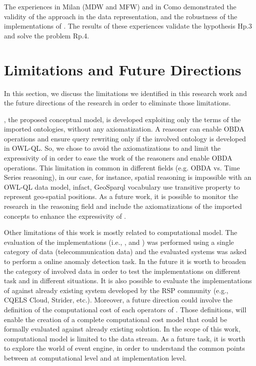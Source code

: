 The experiences in Milan (MDW and MFW) and in Como demonstrated the validity of the \frappe{} approach in the data representation, and the robustness of the implementations of \river{}.
The results of these experiences validate the hypothesis \textsf{Hp.3} and solve the problem \textsf{Rp.4}.

\section{Limitations and Future Directions}
In this section, we discuss the limitations we identified in this research work and the future directions of the research in order to eliminate those limitations.

\frappe{}, the proposed conceptual model, is developed exploiting only the terms of the imported ontologies, without any axiomatization. 
A reasoner can enable OBDA operations and ensure query rewriting only if the involved ontology is developed in OWL-QL.
So, we chose to avoid the axiomatizations to and limit the expressivity of \frappe{} in order to ease the work of the reasoners and enable OBDA operations.
This limitation in common in different fields (e.g. OBDA vs. Time Series reasoning), in our case, for instance,  spatial reasoning is impossible with an OWL-QL data model, infact, GeoSparql vocabulary use transitive property to represent geo-spatial positions.
As a future work, it is possible to monitor the research in the reasoning field and include the axiomatizations of the imported concepts to enhance the expressivity of \frappe{}.

Other limitations of this work is mostly related to \river{} computational model.
The evaluation of the \river{} implementations (i.e., \sti{}, \sparkdi{} and \hivedi{}) was performed using a single category of data (telecommunication data) and the evaluated systems was asked to perform a online anomaly detection task.
In the future it is worth to broaden the category of involved data in order to test the implementations on different task and in different situations.
It is also possible to evaluate the implementations of \river{} against already existing system developed by the RSP community (e.g., CQELS Cloud, Strider, etc.). 
Moreover, a future direction could involve the definition of the computational cost of each operators of \river{}. Those definitions, will enable the creation of a complete computational cost model that could be formally evaluated against already existing solution.
In the scope of this work,  \river{} computational model is limited to the data stream. As a future task, it is worth to explore the world of event engine, in order to understand the common points between at computational level and at implementation level. 

